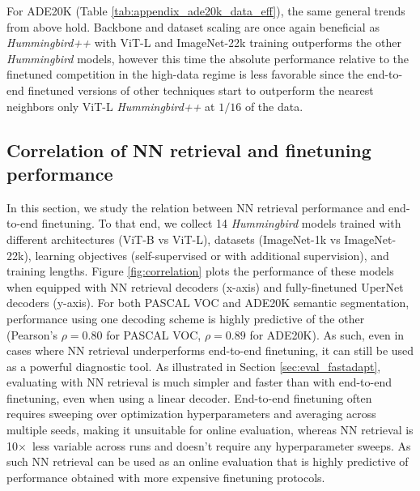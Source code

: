 \documentclass{article}
\newcommand{\ours}{\textit{Hummingbird} }
\newcommand{\oursup}{\textit{Hummingbird}\textit{++} }
\newcommand{\x}{$\times$}
\begin{document}
For ADE20K (Table \ref{tab:appendix_ade20k_data_eff}), the same general trends from above hold. Backbone and dataset scaling are once again beneficial as \oursup with ViT-L and ImageNet-22k training outperforms the other \ours models, however this time the absolute performance relative to the finetuned competition in the high-data regime is less favorable since the end-to-end finetuned versions of other techniques start to outperform the nearest neighbors only ViT-L \oursup at \(1/16\) of the data.



\subsection{Correlation of NN retrieval and finetuning performance}
\label{sec:app-correlation}

In this section, we study the relation between NN retrieval performance and end-to-end finetuning. To that end, we collect 14 \ours models trained with different architectures (ViT-B vs ViT-L), datasets (ImageNet-1k vs ImageNet-22k), learning objectives (self-supervised or with additional supervision), and training lengths. Figure \ref{fig:correlation} plots the performance of these models when equipped with NN retrieval decoders (x-axis) and fully-finetuned UperNet decoders (y-axis). For both PASCAL VOC and ADE20K semantic segmentation, performance using one decoding scheme is highly predictive of the other (Pearson's $\rho = 0.80$ for PASCAL VOC, $\rho = 0.89$ for ADE20K). As such, even in cases where NN retrieval underperforms end-to-end finetuning, it can still be used as a powerful diagnostic tool. As illustrated in Section \ref{sec:eval_fastadapt}, evaluating with NN retrieval is much simpler and faster than with end-to-end finetuning, even when using a linear decoder. End-to-end finetuning often requires sweeping over optimization hyperparameters and averaging across multiple seeds, making it unsuitable for online evaluation, whereas NN retrieval is 10\x \ less variable across runs and doesn't require any hyperparameter sweeps. As such NN retrieval can be used as an online evaluation that is highly predictive of performance obtained with more expensive finetuning protocols.
\end{document}
